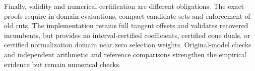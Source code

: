 Finally, validity and numerical certification are different obligations. The exact proofs require in-domain evaluations, compact candidate sets and enforcement of old cuts. The implementation retains full tangent offsets and validates recovered incumbents, but provides no interval-certified coefficients, certified cone duals, or certified normalization domain near zero selection weights. Original-model checks and independent arithmetic and reference comparisons strengthen the empirical evidence but remain numerical checks.
